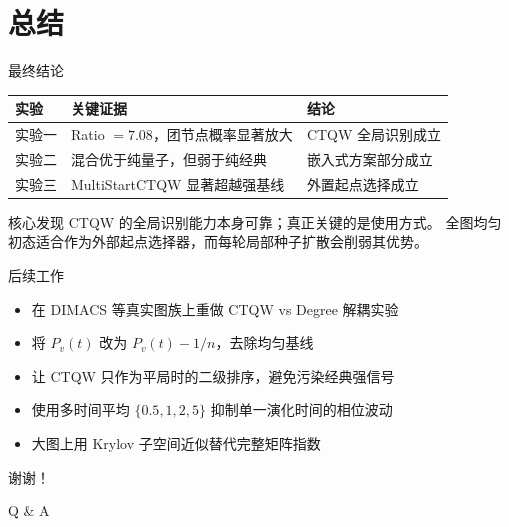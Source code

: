 \documentclass[aspectratio=169,10pt]{ctexbeamer}
\begin{document}
\section{总结}

\begin{frame}{最终结论}
  \centering
  \renewcommand{\arraystretch}{1.25}
  \begin{tabular}{p{}p{}p{}}
    \toprule
    实验 & 关键证据 & 结论 \\
    \midrule
    实验一 & Ratio $=7.08$，团节点概率显著放大 & CTQW 全局识别成立 \\
    实验二 & 混合优于纯量子，但弱于纯经典 & 嵌入式方案部分成立 \\
    实验三 & MultiStartCTQW 显著超越强基线 & 外置起点选择成立 \\
    \bottomrule
  \end{tabular}

  \vspace{1.2em}
  \begin{block}{核心发现}
    CTQW 的全局识别能力本身可靠；真正关键的是使用方式。
    全图均匀初态适合作为外部起点选择器，而每轮局部种子扩散会削弱其优势。
  \end{block}
\end{frame}

\begin{frame}{后续工作}
  \begin{itemize}
    \item 在 DIMACS 等真实图族上重做 CTQW vs Degree 解耦实验
    \item 将 $P_v(t)$ 改为 $P_v(t)-1/n$，去除均匀基线
    \item 让 CTQW 只作为平局时的二级排序，避免污染经典强信号
    \item 使用多时间平均 $\{0.5,1,2,5\}$ 抑制单一演化时间的相位波动
    \item 大图上用 Krylov 子空间近似替代完整矩阵指数
  \end{itemize}
\end{frame}

\begin{frame}
  \centering
  \vspace{2em}
  {\Huge 谢谢！}

  \vspace{2em}
  \large Q \& A
\end{frame}
\end{document}
